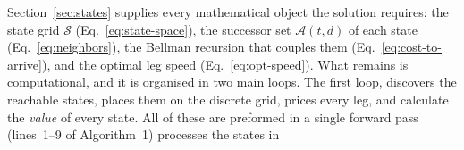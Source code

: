 \documentclass[review,authoryear]{elsarticle}
\begin{document}

Section~\ref{sec:states} supplies every mathematical object the solution requires: the state grid
$\mathcal{S}$ (Eq.~\eqref{eq:state-space}), the successor set $\mathcal{A}(t,d)$ of each state
(Eq.~\eqref{eq:neighbors}), the Bellman recursion that couples them
(Eq.~\eqref{eq:cost-to-arrive}), and the optimal leg speed (Eq.~\eqref{eq:opt-speed}). What remains
is computational, and it is organised in two main loops. The first loop, discovers the reachable states,
places them on the discrete grid, prices every leg, and calculate the \emph{value} of every state.  All of these are preformed in a single forward pass (lines~1--9 of Algorithm~1) processes the states in
\end{document}
